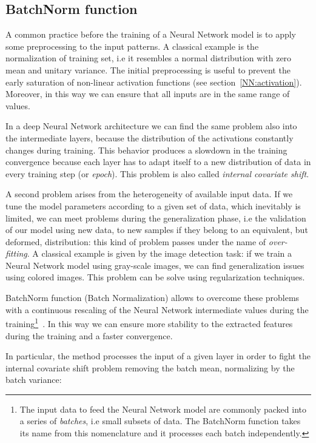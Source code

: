 \documentclass{standalone}
\begin{document}
\subsection[BatchNorm function]{BatchNorm function}\label{NN:batchnorm}

A common practice before the training of a Neural Network model is to apply some preprocessing to the input patterns.
A classical example is the normalization of training set, i.e it resembles a normal distribution with zero mean and unitary variance.
The initial preprocessing is useful to prevent the early saturation of non-linear activation functions (see section~\ref{NN:activation}).
Moreover, in this way we can ensure that all inputs are in the same range of values.

In a deep Neural Network architecture we can find the same problem also into the intermediate layers, because the distribution of the activations constantly changes during training.
This behavior produces a slowdown in the training convergence because each layer has to adapt itself to a new distribution of data in every training step (or \emph{epoch}).
This problem is also called \emph{internal covariate shift}.

A second problem arises from the heterogeneity of available input data.
If we tune the model parameters according to a given set of data, which inevitably is limited, we can meet problems during the generalization phase, i.e the validation of our model using new data, to new samples if they belong to an equivalent, but deformed, distribution: this kind of problem passes under the name of \emph{over-fitting}.
A classical example is given by the image detection task: if we train a Neural Network model using gray-scale images, we can find generalization issues using colored images.
This problem can be solve using regularization techniques.

BatchNorm function (Batch Normalization) allows to overcome these problems with a continuous rescaling of the Neural Network intermediate values during the training\footnote{
  The input data to feed the Neural Network model are commonly packed into a series of \emph{batches}, i.e small subsets of data.
  The BatchNorm function takes its name from this nomenclature and it processes each batch independently.
}~\cite{Sergey2015BatchNorm}.
In this way we can ensure more stability to the extracted features~\cite{Lecun2000EffBackProp} during the training and a faster convergence.

In particular, the method processes the input of a given layer in order to fight the internal covariate shift problem removing the batch mean, normalizing by the batch variance:
\end{document}

